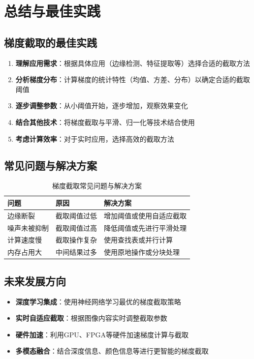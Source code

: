 \documentclass{article}
\begin{document}
\section{总结与最佳实践}

\subsection{梯度截取的最佳实践}

\begin{enumerate}
    \item \textbf{理解应用需求}：根据具体应用（边缘检测、特征提取等）选择合适的截取方法
    \item \textbf{分析梯度分布}：计算梯度的统计特性（均值、方差、分布）以确定合适的截取阈值
    \item \textbf{逐步调整参数}：从小阈值开始，逐步增加，观察效果变化
    \item \textbf{结合其他技术}：将梯度截取与平滑、归一化等技术结合使用
    \item \textbf{考虑计算效率}：对于实时应用，选择高效的截取方法
\end{enumerate}

\subsection{常见问题与解决方案}

\begin{table}[h]
\centering
\caption{梯度截取常见问题与解决方案}
\begin{tabular}{|p{}|p{}|p{}|}
\hline
\textbf{问题} & \textbf{原因} & \textbf{解决方案} \\
\hline
边缘断裂 & 截取阈值过低 & 增加阈值或使用自适应截取 \\
\hline
噪声未被抑制 & 截取阈值过高 & 降低阈值或先进行平滑处理 \\
\hline
计算速度慢 & 截取操作复杂 & 使用查找表或并行计算 \\
\hline
内存占用大 & 中间结果过多 & 使用原地操作或分块处理 \\
\hline
\end{tabular}
\end{table}

\subsection{未来发展方向}

\begin{itemize}
    \item \textbf{深度学习集成}：使用神经网络学习最优的梯度截取策略
    \item \textbf{实时自适应截取}：根据图像内容实时调整截取参数
    \item \textbf{硬件加速}：利用GPU、FPGA等硬件加速梯度计算与截取
    \item \textbf{多模态融合}：结合深度信息、颜色信息等进行更智能的梯度截取
\end{itemize}
\end{document}
